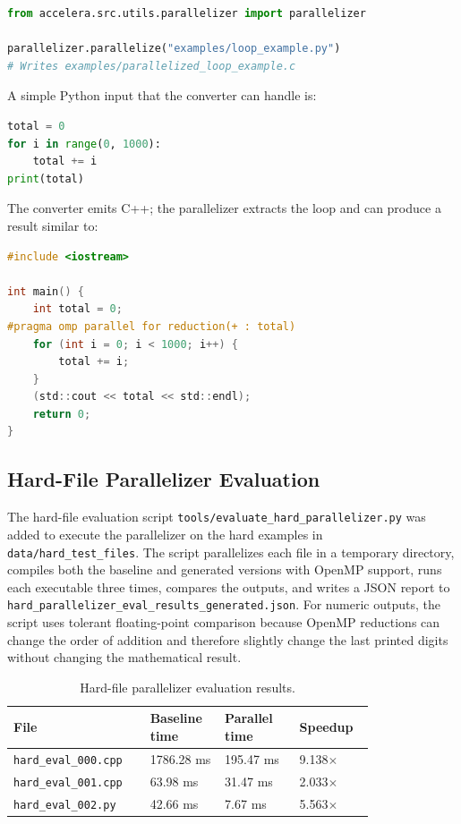 \documentclass[11pt,a4paper]{article}
\newcommand{\modulepath}[1]{\texttt{#1}}
\begin{document}
\begin{lstlisting}[language=Python]
from accelera.src.utils.parallelizer import parallelizer

parallelizer.parallelize("examples/loop_example.py")
# Writes examples/parallelized_loop_example.c
\end{lstlisting}

A simple Python input that the converter can handle is:

\begin{lstlisting}[language=Python]
total = 0
for i in range(0, 1000):
    total += i
print(total)
\end{lstlisting}

The converter emits C++; the parallelizer extracts the loop and can produce a
result similar to:

\begin{lstlisting}[language=C]
#include <iostream>

int main() {
    int total = 0;
#pragma omp parallel for reduction(+ : total)
    for (int i = 0; i < 1000; i++) {
        total += i;
    }
    (std::cout << total << std::endl);
    return 0;
}
\end{lstlisting}

\subsection{Hard-File Parallelizer Evaluation}

The hard-file evaluation script
\modulepath{tools/evaluate\_hard\_parallelizer.py} was added to execute the
parallelizer on the hard examples in \modulepath{data/hard\_test\_files}. The
script parallelizes each file in a temporary directory, compiles both the
baseline and generated versions with OpenMP support, runs each executable
three times, compares the outputs, and writes a JSON report to
\modulepath{hard\_parallelizer\_eval\_results\_generated.json}. For numeric
outputs, the script uses tolerant floating-point comparison because OpenMP
reductions can change the order of addition and therefore slightly change the
last printed digits without changing the mathematical result.

\begin{table}[H]
\centering
\caption{Hard-file parallelizer evaluation results.}
\begin{tabular}{p{0.28\linewidth}p{0.18\linewidth}p{0.18\linewidth}p{0.16\linewidth}}
\toprule
\textbf{File} & \textbf{Baseline time} & \textbf{Parallel time} &
\textbf{Speedup}\\
\midrule
\texttt{hard\_eval\_000.cpp} & 1786.28 ms & 195.47 ms & 9.138$\times$\\
\texttt{hard\_eval\_001.cpp} & 63.98 ms & 31.47 ms & 2.033$\times$\\
\texttt{hard\_eval\_002.py} & 42.66 ms & 7.67 ms & 5.563$\times$\\
\bottomrule
\end{tabular}
\end{table}
\end{document}
